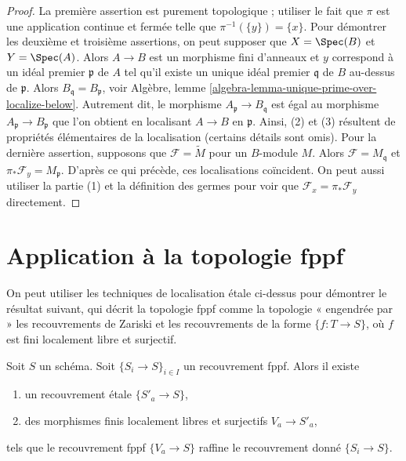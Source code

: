 \begin{proof}
La première assertion est purement topologique ; utiliser le fait que
$\pi$ est une application continue et fermée telle que $\pi^{-1}(\{y\}) = \{x\}$.
Pour démontrer les deuxième et troisième assertions, on peut supposer que
$X = \Spec(B)$ et $Y = \Spec(A)$. Alors
$A \to B$ est un morphisme fini d'anneaux et $y$ correspond à un idéal premier
$\mathfrak p$ de $A$ tel qu'il existe un unique idéal premier $\mathfrak q$ de
$B$ au-dessus de $\mathfrak p$. Alors
$B_{\mathfrak q} = B_{\mathfrak p}$, voir
Algèbre, lemme \ref{algebra-lemma-unique-prime-over-localize-below}.
Autrement dit, le morphisme $A_{\mathfrak p} \to B_{\mathfrak q}$
est égal au morphisme $A_{\mathfrak p} \to B_{\mathfrak p}$ que l'on obtient
en localisant $A \to B$ en $\mathfrak p$.
Ainsi, (2) et (3) résultent de propriétés élémentaires de la localisation
(certains détails sont omis). Pour la dernière assertion, supposons que
$\mathcal{F} = \widetilde M$ pour un $B$-module $M$.
Alors $\mathcal{F} = M_{\mathfrak q}$ et
$\pi_*\mathcal{F}_y = M_{\mathfrak p}$. D'après ce qui précède, ces
localisations coïncident. On peut aussi utiliser la partie (1) et
la définition des germes pour voir que $\mathcal{F}_x = \pi_*\mathcal{F}_y$
directement.
\end{proof}






\section{Application à la topologie fppf}
\label{section-application-fppf}

\noindent
On peut utiliser les techniques de localisation \'etale ci-dessus pour démontrer le
résultat suivant, qui décrit la topologie fppf comme la topologie
« engendrée par » les recouvrements de Zariski et les recouvrements de la
forme $\{f : T \to S\}$, où $f$ est fini localement libre et surjectif.

\begin{lemma}
\label{lemma-dominate-fppf-etale-locally}
Soit $S$ un schéma. Soit $\{S_i \to S\}_{i \in I}$ un recouvrement fppf.
Alors il existe
\begin{enumerate}
\item un recouvrement \'etale $\{S'_a \to S\}$,
\item des morphismes finis localement libres et surjectifs $V_a \to S'_a$,
\end{enumerate}
tels que le recouvrement fppf $\{V_a \to S\}$ raffine le
recouvrement donné $\{S_i \to S\}$.
\end{lemma}

